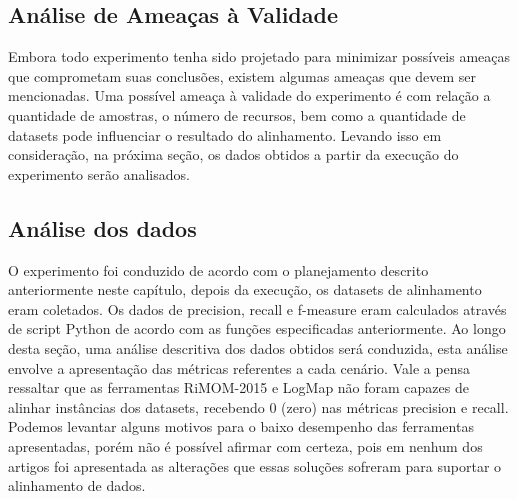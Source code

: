 \subsection*{Análise de Ameaças à Validade}
Embora todo experimento tenha sido projetado para minimizar possíveis ameaças que comprometam suas conclusões, existem algumas ameaças que devem ser mencionadas. Uma possível ameaça à validade do experimento é com relação a quantidade de amostras, o número de recursos, bem como a quantidade de datasets pode influenciar o resultado do alinhamento.
Levando isso em consideração, na próxima seção, os dados obtidos a partir da execução do experimento serão analisados.

\subsection*{Análise dos dados}
O experimento foi conduzido de acordo com o planejamento descrito anteriormente neste capítulo, depois da execução, os datasets de alinhamento eram coletados. Os dados de precision, recall e f-measure eram calculados através de script Python de acordo com as funções especificadas anteriormente.
Ao longo desta seção, uma análise descritiva dos dados obtidos será conduzida, esta análise envolve a apresentação das métricas referentes a cada cenário. Vale a pensa ressaltar que as ferramentas RiMOM-2015 e LogMap não foram capazes de alinhar instâncias dos datasets, recebendo 0 (zero) nas métricas precision e recall. Podemos levantar alguns motivos para o baixo desempenho das ferramentas apresentadas, porém não é possível afirmar com certeza, pois em nenhum dos artigos foi apresentada as alterações que essas soluções sofreram para suportar o alinhamento de dados.

